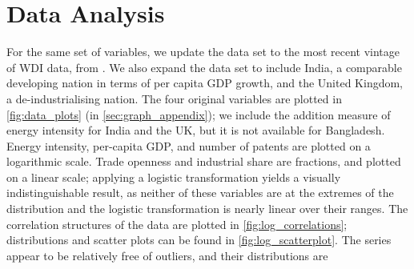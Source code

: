 \documentclass[11pt,a4paper]{article}
\begin{document}
\section{Data Analysis}\label{sec:data_analysis}
For the same set of variables, we update the data set to the most recent vintage of WDI data, from \cite{theworldbankWorldDevelopmentIndicators2019}.
We also expand the data set to include India, a comparable developing nation in terms of per capita GDP growth, and the United Kingdom, a de-industrialising nation.
The four original variables are plotted in \cref{fig:data_plots} (in \cref{sec:graph_appendix}); we include the addition measure of energy intensity for India and the UK, but it is not available for Bangladesh.
Energy intensity, per-capita GDP, and number of patents are plotted on a logarithmic scale.
Trade openness and industrial share are fractions, and plotted on a linear scale; applying a logistic transformation yields a visually indistinguishable result, as neither of these variables are at the extremes of the distribution and the logistic transformation is nearly linear over their ranges.
The correlation structures of the data are plotted in \cref{fig:log_correlations}; distributions and scatter plots can be found in \cref{fig:log_scatterplot}.
The series appear to be relatively free of outliers, and their distributions are  
\end{document}
